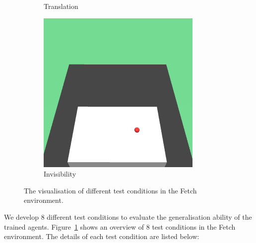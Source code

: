 \begin{figure}[h!]
\begin{subfigure}{0.32\textwidth}
    \caption{Translation}
  \end{subfigure}
  \begin{subfigure}{0.32\textwidth}
    \includegraphics[width=\textwidth]{figures/chapter6/test_observations/invisible}
    \caption{Invisibility}
  \end{subfigure}
  \caption{The visualisation of different test conditions in the Fetch environment.}
  \label{fig:tests}
\end{figure}
We develop 8 different test conditions to evaluate the generalisation ability of the trained agents. Figure~\ref{fig:tests} shows an overview of 8 test conditions in the Fetch environment. The details of each test condition are listed below:
